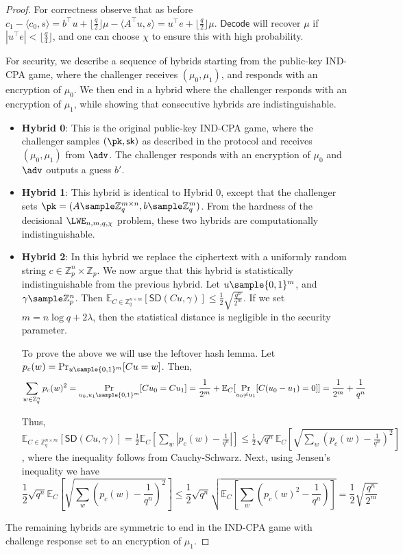 \begin{proof}
    For correctness observe that as before $c_1 - \langle c_0, s\rangle = b^\intercal u + \lfloor\frac{q}{2}\rfloor\mu - \langle A^\intercal u, s\rangle = u^\intercal e + \lfloor\frac{q}{2}\rfloor\mu$. $\mathsf{Decode}$ will recover $\mu$ if $|u^\intercal e| < \lfloor\frac{q}{4}\rfloor$, and one can choose $\chi$ to ensure this with high probability.

    For security, we describe a sequence of hybrids starting from the public-key IND-CPA game, where the challenger receives $(\mu_0, \mu_1)$, and responds with an encryption of $\mu_0$. We then end in a hybrid where the challenger responds with an encryption of $\mu_1$, while showing that consecutive hybrids are indistinguishable.

    \begin{itemize}
        \item \textbf{Hybrid 0}: This is the original public-key IND-CPA game, where the challenger samples $(\pk, \sk)$ as described in the protocol and receives $(\mu_0, \mu_1)$ from $\adv$. The challenger responds with an encryption of $\mu_0$ and $\adv$ outputs a guess $b'$.
        \item \textbf{Hybrid 1}: This hybrid is identical to Hybrid 0, except that the challenger sets $\pk = (A \sample \mathbb{Z}_q^{m \times n}, b \sample \mathbb{Z}_q^m)$. From the hardness of the decisional $\LWE_{n,m,q,\chi}$ problem, these two hybrids are computationally indistinguishable.
        \item \textbf{Hybrid 2}: In this hybrid we replace the ciphertext with a uniformly random string $c\in \mathbb{Z}_p^{n} \times \mathbb{Z}_p$. We now argue that this hybrid is statistically indistinguishable from the previous hybrid. Let $u \sample \{0,1\}^m$, and $\gamma \sample \mathbb{Z}_p^n$. Then $\mathbb{E}_{C \in \mathbb{Z}_q^{n \times m}}[\mathsf{SD}(C u, \gamma)] \leq \frac{1}{2} \sqrt{\frac{q^n}{2^m}}$. If we set $m = n \log{q} + 2\lambda$, then the statistical distance is negligible in the security parameter.

              To prove the above we will use the leftover hash lemma. Let $p_c(w) = \Pr_{u \sample \{0,1\}^m} [C u = w]$. Then,
              \[\sum_{w \in \mathbb{Z}_q^n} p_c(w)^2 = \Pr_{u_0, u_1 \sample \{0,1\}^m} [Cu_0 = Cu_1] = \frac{1}{2^m} + \mathbb{E}_C[\Pr_{u_0 \neq u_1}[C(u_0 - u_1) = 0]] = \frac{1}{2^m} + \frac{1}{q^n} \]

              Thus, $\mathbb{E}_{C \in \mathbb{Z}_q^{n \times m}}[\mathsf{SD}(C u, \gamma)] = \frac{1}{2}\mathbb{E}_{C}[\sum_w |p_c(w) - \frac{1}{q^n}|]\leq \frac{1}{2}\sqrt{q^n}\mathbb{E}_{C}\left[ \sqrt{\sum_w (p_c(w) - \frac{1}{q^n})^2} \right]$,
              where the inequality follows from Cauchy-Schwarz. Next, using Jensen's inequality we have
              \[ \frac{1}{2}\sqrt{q^n}\mathbb{E}_C\left[ \sqrt{\sum_w (p_c(w) - \frac{1}{q^n})^2}\right] \leq \frac{1}{2}\sqrt{q^n}\sqrt{\mathbb{E}_C \left[\sum_w (p_c(w)^2 - \frac{1}{q^n})\right] } = \frac{1}{2}\sqrt{\frac{q^n}{2^m}}\]
    \end{itemize}
    The remaining hybrids are symmetric to end in the IND-CPA game with challenge response set to an encryption of $\mu_1$.
\end{proof}
